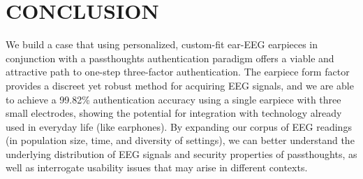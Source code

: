 \documentclass[a4paper,twoside]{article}
\begin{document}
\section{\uppercase{Conclusion}}
\label{sec:conclusion}

\noindent We build a case that using personalized, custom-fit ear-EEG earpieces in conjunction with a passthoughts authentication paradigm offers a viable and attractive path to one-step three-factor authentication. The earpiece form factor provides a discreet yet robust method for acquiring EEG signals, and we are able to achieve a 99.82\% authentication accuracy using a single earpiece with three small electrodes, showing the potential for integration with technology already used in everyday life (like earphones). By expanding our corpus of EEG readings (in population size, time, and diversity of settings), we can better understand the underlying distribution of EEG signals and security properties of passthoughts, as well as interrogate usability issues that may arise in different contexts.


{\small
}

\vfill
\end{document}
